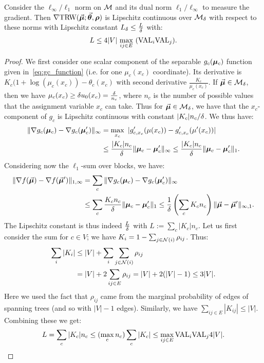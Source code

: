 \begin{lemma}
	\label{lem:trw_bounded_lip_eps}
	Consider the $\ell_\infty/\ell_1$ norm on $\mathcal{M}$ and its dual norm $\ell_1/\ell_\infty$ to measure the gradient. Then
$\nabla \text{TRW}(\vec{\bm{\mu}};\vec{\bm{\theta}},\bm{\rho})$ is Lipschitz continuous over $\mathcal{M}_{\delta}$ with respect to these norms with Lipschitz constant 
$L_{\delta} \leq \frac{L}{\delta}$ with:
\begin{equation} \label{eq:TRW_L_constant} 
L \leq 4 |V| \,  \max_{ij \in E} \,\, (\textrm{VAL}_i\textrm{VAL}_j).
\end{equation}
\end{lemma}
\begin{proof}
	We first consider one scalar component of the separable $g_c(\bm{\mu}_c)$ function given in~\eqref{eq:gc_function} (i.e. for one $\mu_c(x_c)$ coordinate). Its derivative is $K_c (1 + \log (\mu_c(x_c)) - \theta_c(x_c)$ with second derivative $\frac{K_c}{ \mu_c(x_c)}$. If $\vec{\bm{\mu}} \in \mathcal{M}_{\delta}$, then we have $\mu_c(x_c) \geq \delta u_0(x_c) = \frac{\delta}{n_c}$, where $n_c$ is the number of possible values that the assignment variable $x_c$ can take. Thus for $\vec{\bm{\mu}} \in \mathcal{M}_{\delta}$, we have that the $x_c$-component of $g_c$ is Lipschitz continuous with constant $|K_c| n_c / \delta$. We thus have:
	\begin{align*}
	\| \nabla g_c(\bm{\mu}_c) - \nabla g_c(\bm{\mu}'_c) \|_\infty &= \max_{x_c} \,\, | g'_{c, x_c} (\mu(x_c)) - g'_{c, x_c} (\mu'(x_c)) | \\
	&\leq \frac{|K_c| n_c}{\delta} \|\bm{\mu}_c - \bm{\mu}_c' \|_\infty \leq \frac{|K_c| n_c}{\delta} \|\bm{\mu}_c - \bm{\mu}_c' \|_1.
	\end{align*}
	Considering now the $\ell_1$-sum over blocks, we have:
	\begin{align*}
	\|\nabla f(\vec{\bm{\mu}}) - \nabla f(\vec{\bm{\mu}}') \|_{1,\infty} &= \sum_c \| \nabla g_c(\bm{\mu}_c) - \nabla g_c(\bm{\mu}'_c) \|_\infty  \\  
	&\leq \sum_c \frac{K_c n_c}{\delta} \|\bm{\mu}_c - \bm{\mu}_c' \|_1 \leq \frac{1}{\delta} \left(\sum_c K_c n_c \right) \| \vec{\bm{\mu}} - \vec{\bm{\mu}}' \|_{\infty, 1}.
	\end{align*}
	The Lipschitz constant is thus indeed $\frac{L}{\delta}$ with $L := \sum_c |K_c| n_c$.
	Let us first consider the sum for $c \in V$; we have $K_i = 1 - \sum_{j \in \mathcal{N}(i)} \rho_{ij}$. 
	Thus:
	\begin{align*}
	\sum_i |K_i| &\leq |V| + \sum_i \sum_{j \in \mathcal{N}(i)} \rho_{ij} \\
				&= |V| + 2 \sum_{ij \in E} \rho_{ij} = |V| + 2 (|V| - 1) \leq 3 |V|. 	
	\end{align*}
	Here we used the fact that $\rho_{ij}$ came from the marginal probability of edges of spanning trees (and so with $|V|-1$ edges). Similarly, we have $\sum_{ij \in E} |K_{ij}| \leq |V|$. Combining these we get:
	\begin{align} \label{eq:Kc_bound}
	L = \sum_c |K_c| n_c \leq (\max_c n_c) \sum_c |K_c| \leq \max_{ij \in E} \textrm{VAL}_i \textrm{VAL}_j 4 |V|.
	\end{align}
\end{proof}

